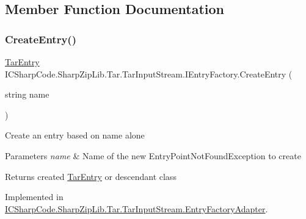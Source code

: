 \subsection{Member Function Documentation}
\mbox{\label{interface_i_c_sharp_code_1_1_sharp_zip_lib_1_1_tar_1_1_tar_input_stream_1_1_i_entry_factory_a2534ff030c9132b43c76e4ad812558f9}} 
\subsubsection{\texorpdfstring{Create\+Entry()}{CreateEntry()}\hspace{0.1cm}{\footnotesize\ttfamily [1/2]}}
{\footnotesize\ttfamily \hyperlink{class_i_c_sharp_code_1_1_sharp_zip_lib_1_1_tar_1_1_tar_entry}{Tar\+Entry} I\+C\+Sharp\+Code.\+Sharp\+Zip\+Lib.\+Tar.\+Tar\+Input\+Stream.\+I\+Entry\+Factory.\+Create\+Entry (\begin{DoxyParamCaption}\item[{string}]{name }\end{DoxyParamCaption})}



Create an entry based on name alone 


\begin{DoxyParams}{Parameters}
{\em name} & Name of the new Entry\+Point\+Not\+Found\+Exception to create \\
\hline
\end{DoxyParams}
\begin{DoxyReturn}{Returns}
created \hyperlink{class_i_c_sharp_code_1_1_sharp_zip_lib_1_1_tar_1_1_tar_entry}{Tar\+Entry} or descendant class
\end{DoxyReturn}


Implemented in \hyperlink{class_i_c_sharp_code_1_1_sharp_zip_lib_1_1_tar_1_1_tar_input_stream_1_1_entry_factory_adapter_ae6f5f3df4f39bc1f87f2307d32a5ca04}{I\+C\+Sharp\+Code.\+Sharp\+Zip\+Lib.\+Tar.\+Tar\+Input\+Stream.\+Entry\+Factory\+Adapter}.

